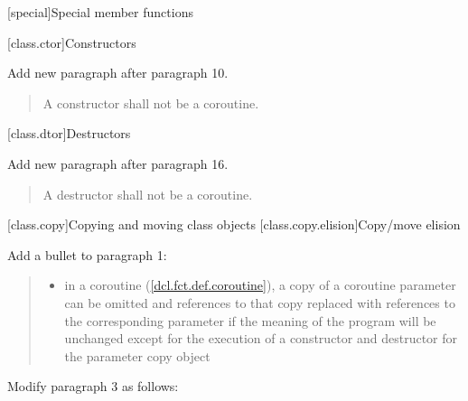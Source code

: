 
\begingroup
\renewcommand{\cleardoublepage}{}
\renewcommand{\clearpage}{}
[special]{Special member functions}
\endgroup

\setcounter{section}{0}
[class.ctor]{Constructors}%

Add new paragraph after paragraph 10.

	\setcounter{Paras}{10}
\begin{quote}
	\pnum A constructor shall not be a coroutine.
\end{quote}

\setcounter{section}{3}
[class.dtor]{Destructors}%

Add new paragraph after paragraph 16.

	\setcounter{Paras}{16}
\begin{quote}
	\pnum A destructor shall not be a coroutine.
\end{quote}

\pagebreak

\setcounter{section}{7}
[class.copy]{Copying and moving class objects}%
\setcounter{subsection}{2}
[class.copy.elision]{Copy/move elision}%

Add a bullet to paragraph 1:

\begin{quote}
\begin{itemize}
	\item in a coroutine (\ref{dcl.fct.def.coroutine}), a copy of a coroutine parameter  can be omitted
	and references to that copy replaced with references to the corresponding parameter if the meaning of the program will
	be unchanged except for the execution of a constructor and destructor for the parameter copy object
\end{itemize}
\end{quote} 

Modify paragraph 3 as follows:

